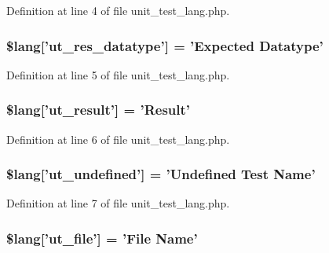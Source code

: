 Definition at line 4 of file unit\-\_\-test\-\_\-lang.\-php.

\hypertarget{unit__test__lang_8php_a104083e98991c97a0ffa647a05541146}{
\subsubsection[{\$lang}]{\setlength{\rightskip}{0pt plus 5cm}\$lang\mbox{[}'ut\-\_\-res\-\_\-datatype'\mbox{]} = 'Expected Datatype'}}\label{unit__test__lang_8php_a104083e98991c97a0ffa647a05541146}


Definition at line 5 of file unit\-\_\-test\-\_\-lang.\-php.

\hypertarget{unit__test__lang_8php_a01f12785712ee32a97dc53d85e226993}{
\subsubsection[{\$lang}]{\setlength{\rightskip}{0pt plus 5cm}\$lang\mbox{[}'ut\-\_\-result'\mbox{]} = 'Result'}}\label{unit__test__lang_8php_a01f12785712ee32a97dc53d85e226993}


Definition at line 6 of file unit\-\_\-test\-\_\-lang.\-php.

\hypertarget{unit__test__lang_8php_a08d38874ed86b9368f126d7597801077}{
\subsubsection[{\$lang}]{\setlength{\rightskip}{0pt plus 5cm}\$lang\mbox{[}'ut\-\_\-undefined'\mbox{]} = 'Undefined {\bf Test} Name'}}\label{unit__test__lang_8php_a08d38874ed86b9368f126d7597801077}


Definition at line 7 of file unit\-\_\-test\-\_\-lang.\-php.

\hypertarget{unit__test__lang_8php_aadb1d48c93ccef9a1f4e61d529f8ee80}{
\subsubsection[{\$lang}]{\setlength{\rightskip}{0pt plus 5cm}\$lang\mbox{[}'ut\-\_\-file'\mbox{]} = 'File Name'}}\label{unit__test__lang_8php_aadb1d48c93ccef9a1f4e61d529f8ee80}


